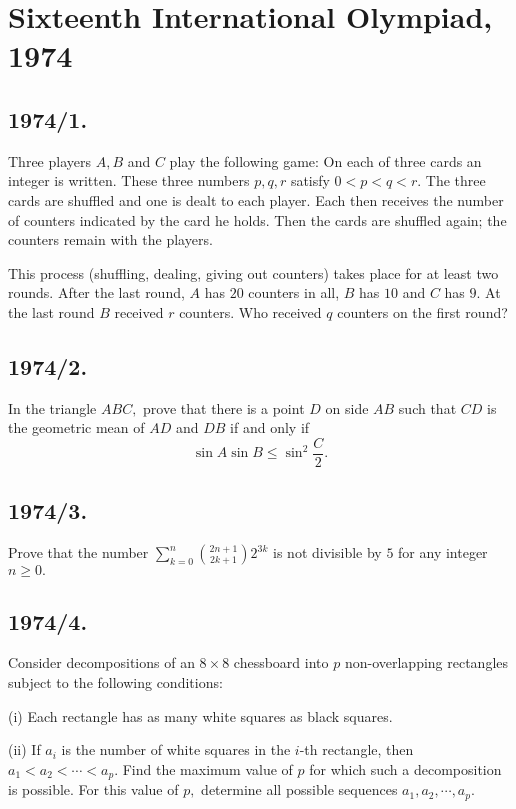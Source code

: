 \documentclass[12pt,thmsa]{article}
\begin{document}
\section{Sixteenth International Olympiad, 1974}

\subsection{1974/1. }

Three players $A,B$ and $C$ play the following game: On each of three cards
an integer is written. These three numbers $p,q,r$ satisfy $0<p<q<r.$ The
three cards are shuffled and one is dealt to each player. Each then receives
the number of counters indicated by the card he holds. Then the cards are
shuffled again; the counters remain with the players.

This process (shuffling, dealing, giving out counters) takes place for at
least two rounds. After the last round, $A$ has $20$ counters in all, $B$
has $10$ and $C$ has $9.$ At the last round $B$ received $r$ counters. Who
received $q$ counters on the first round?

\subsection{1974/2. }

In the triangle $ABC,$ prove that there is a point $D$ on side $AB$ such
that $CD$ is the geometric mean of $AD$ and $DB$ if and only if
\[
\sin A\sin B\leq \sin ^{2}\frac{C}{2}.
\]

\subsection{1974/3. }

Prove that the number $\sum_{k=0}^{n}\binom{2n+1}{2k+1}2^{3k}$ is not
divisible by $5$ for any integer $n\geq 0.$

\subsection{1974/4. }

Consider decompositions of an $8\times 8$ chessboard into $p$
non-overlapping rectangles subject to the following conditions:

(i) Each rectangle has as many white squares as black squares.

(ii) If $a_{i}$ is the number of white squares in the $i$-th rectangle, then 
$a_{1}<a_{2}<\cdots <a_{p}$. Find the maximum value of $p$ for which such a
decomposition is possible. For this value of $p,$ determine all possible
sequences $a_{1},a_{2},\cdots ,a_{p}$.
\end{document}
